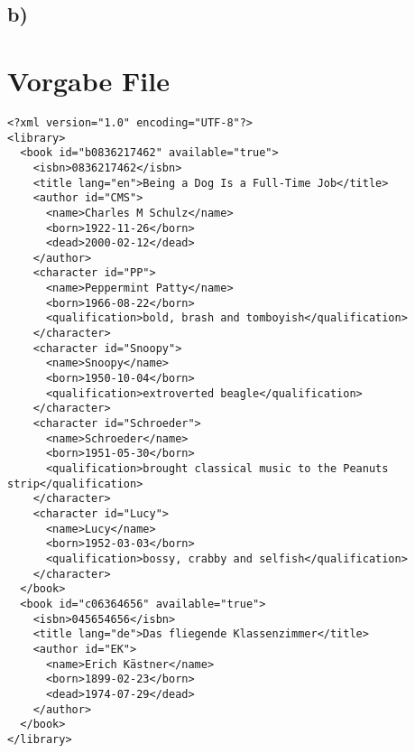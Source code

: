 \documentclass{az_article}
\begin{document}
\subsection{b)}
\label{sec:org588e43e}
\section{Vorgabe File}
\label{sec:orgd5fdaf0}
\begin{verbatim}
<?xml version="1.0" encoding="UTF-8"?>
<library>
  <book id="b0836217462" available="true">
    <isbn>0836217462</isbn>
    <title lang="en">Being a Dog Is a Full-Time Job</title>
    <author id="CMS">
      <name>Charles M Schulz</name>
      <born>1922-11-26</born>
      <dead>2000-02-12</dead>
    </author>
    <character id="PP">
      <name>Peppermint Patty</name>
      <born>1966-08-22</born>
      <qualification>bold, brash and tomboyish</qualification>
    </character>
    <character id="Snoopy">
      <name>Snoopy</name>
      <born>1950-10-04</born>
      <qualification>extroverted beagle</qualification>
    </character>
    <character id="Schroeder">
      <name>Schroeder</name>
      <born>1951-05-30</born>
      <qualification>brought classical music to the Peanuts strip</qualification>
    </character>
    <character id="Lucy">
      <name>Lucy</name>
      <born>1952-03-03</born>
      <qualification>bossy, crabby and selfish</qualification>
    </character>
  </book>
  <book id="c06364656" available="true">
    <isbn>045654656</isbn>
    <title lang="de">Das fliegende Klassenzimmer</title>
    <author id="EK">
      <name>Erich Kästner</name>
      <born>1899-02-23</born>
      <dead>1974-07-29</dead>
    </author>
  </book>
</library>
\end{verbatim}
\end{document}
